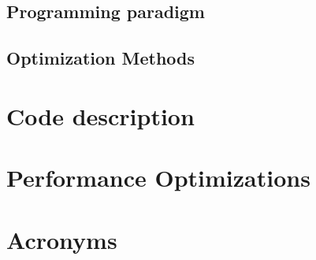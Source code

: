 \documentclass[12pt,oneside,bibtotoc,liststotoc]{scrbook}
\begin{document}
\section{Programming paradigm}

\section{Optimization Methods}



\chapter{Code description}




\chapter{Performance Optimizations}










\newpage


\chapter{Acronyms}

\end{document}
